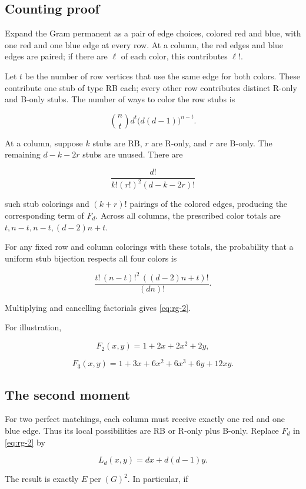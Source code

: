 \documentclass[11pt,a4paper]{article}
\theoremstyle{definition}
\theoremstyle{remark}
\begin{document}
\subsection{Counting proof}\label{configuration-counting-proof}

Expand the Gram permanent as a pair of edge choices, colored red and
blue, with one red and one blue edge at every row. At a column, the red
edges and blue edges are paired; if there are \(\ell\) of each color,
this contributes \(\ell!\).

Let \(t\) be the number of row vertices that use the same edge for both
colors. These contribute one stub of type RB each; every other row
contributes distinct R-only and B-only stubs. The number of ways to
color the row stubs is

\[
\binom nt d^t\bigl(d(d-1)\bigr)^{n-t}.
\]

At a column, suppose \(k\) stubs are RB, \(r\) are R-only, and \(r\) are
B-only. The remaining \(d-k-2r\) stubs are unused. There are

\[
\frac{d!}{k!(r!)^2(d-k-2r)!}
\]

such stub colorings and \((k+r)!\) pairings of the colored edges,
producing the corresponding term of \(F_d\). Across all columns, the
prescribed color totals are \(t,n-t,n-t,(d-2)n+t\).

For any fixed row and column colorings with these totals, the
probability that a uniform stub bijection respects all four colors is

\[
\frac{t!\,(n-t)!^2\,((d-2)n+t)!}{(dn)!}.
\]

Multiplying and cancelling factorials gives \eqref{eq:rg-2}.

For illustration,

\[
F_2(x,y)=1+2x+2x^2+2y,
\]

\[
F_3(x,y)=1+3x+6x^2+6x^3+6y+12xy.
\]

\subsection{The second moment}\label{configuration-the-second-moment}

For two perfect matchings, each column must receive exactly one red and
one blue edge. Thus its local possibilities are RB or R-only plus
B-only. Replace \(F_d\) in \eqref{eq:rg-2} by

\[
L_d(x,y)=dx+d(d-1)y.
\]

The result is exactly \(E\operatorname{per}(G)^2\). In particular, if
\end{document}

